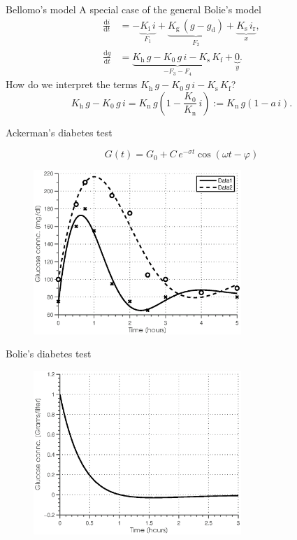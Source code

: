 \documentclass{beamer}
\providecommand{\m}[1]{\ensuremath{\mathrm{#1}}}
\begin{document}
\begin{frame}{Bellomo's model}
A special case of the general Bolie's model
\begin{align*}
 \frac{\m{d}i}{\m{d}t} &= -\underbrace{K_{\mathrm{i}}\,i}_{F_1} + \underbrace{K_{\mathrm{g}}\,(g - g_{\mathrm{d}})}_{F_2} + \underbrace{K_{\mathrm{s}}\,i_{\mathrm{r}}}_{x}, \\
 \frac{\m{d}g}{\m{d}t} &= \underbrace{K_{\mathrm{h}}\,g - K_0\,g\,i - K_{\mathrm{s}}\,K_{\mathrm{f}}}_{-F_3-F_4} + \underbrace{0}_{y}.
\end{align*}
How do we interpret the terms $K_{\mathrm{h}}\,g - K_0\,g\,i - K_{\mathrm{s}}\,K_{\mathrm{f}}$?
\[ K_{\mathrm{h}}\,g - K_0\,g\,i = K_{\mathrm{n}}\,g\left(1 - \frac{K_0}{K_{\mathrm{n}}}\,i\right) := K_{\mathrm{n}}\,g(1 - a\,i). \]

\end{frame}

\begin{frame}{Ackerman's diabetes test}

\begin{equation*}
	\label{Eq:GT}
	G(t) = G_0 + C\,e^{-\sigma t}\cos ( \omega t  - \varphi)
\end{equation*}

\begin{figure}[h!t!]
   \centering
   \includegraphics[width=0.7\textwidth]{figs/ackermanTestPres}
\end{figure}
\end{frame}

\begin{frame}{Bolie's diabetes test}
\begin{figure}[h!t!]
   \centering
   \includegraphics[width=0.7\textwidth]{figs/boliesTestGlucosePres}
\end{figure}
\end{frame}
\end{document}
